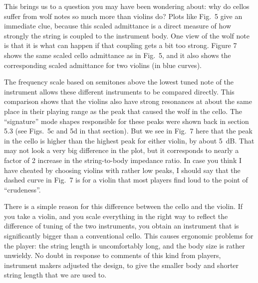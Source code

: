   This brings us to a question you may have been wondering about: why do cellos 
  suffer from wolf notes so much more than violins do? Plots like Fig.\ 5 give 
  an immediate clue, because this scaled admittance is a direct measure of how 
  strongly the string is coupled to the instrument body. One view of the wolf 
  note is that it is what can happen if that coupling gets a bit too strong. 
  Figure 7 shows the same scaled cello admittance as in Fig.\ 5, and it also 
  shows the corresponding scaled admittance for two violins (in blue curves). 


  The frequency scale based on semitones above the lowest tuned note of the 
  instrument allows these different instruments to be compared directly. This 
  comparison shows that the violins also have strong resonances at about the 
  same place in their playing range as the peak that caused the wolf in the 
  cello. The “signature” mode shapes responsible for these peaks were shown 
  back in section 5.3 (see Figs.\ 5c and 5d in that section). But we see in 
  Fig.\ 7 here that the peak in the cello is higher than the highest peak for 
  either violin, by about 5~dB. That may not look a very big difference in the 
  plot, but it corresponds to nearly a factor of 2 increase in the 
  string-to-body impedance ratio. In case you think I have cheated by choosing 
  violins with rather low peaks, I should say that the dashed curve in Fig.\ 7 
  is for a violin that most players find loud to the point of “crudeness”. 

  There is a simple reason for this difference between the cello and the 
  violin. If you take a violin, and you scale everything in the right way to 
  reflect the difference of tuning of the two instruments, you obtain an 
  instrument that is significantly bigger than a conventional cello. This 
  causes ergonomic problems for the player: the string length is uncomfortably 
  long, and the body size is rather unwieldy. No doubt in response to comments 
  of this kind from players, instrument makers adjusted the design, to give the 
  smaller body and shorter string length that we are used to. 

